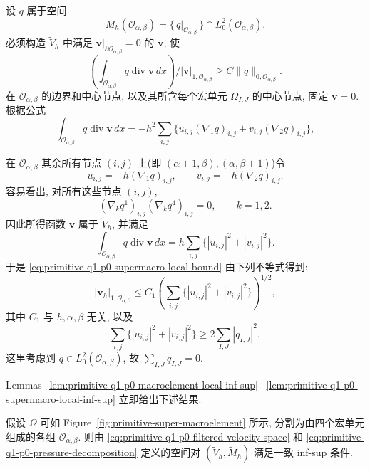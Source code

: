 \begin{Proof}
设 $q$ 属于空间
\[
\bar M_h(\mathcal O_{\alpha,\beta})
=\{\,q|_{\mathcal O_{\alpha,\beta}}\,\}
\cap L_0^2(\mathcal O_{\alpha,\beta}).
\]
必须构造 $\widetilde V_h$ 中满足
$\mathbf v|_{\partial\mathcal O_{\alpha,\beta}}=0$ 的 $\mathbf v$, 使
\begin{equation}\label{eq:primitive-q1-p0-supermacro-local-bound}
\left(\int_{\mathcal O_{\alpha,\beta}}q\operatorname{div}\mathbf v\,dx\right)
/|\mathbf v|_{1,\mathcal O_{\alpha,\beta}}
\geq C\|q\|_{0,\mathcal O_{\alpha,\beta}}.
\end{equation}
在 $\mathcal O_{\alpha,\beta}$ 的边界和中心节点, 以及其所含每个宏单元
$\Omega_{I,J}$ 的中心节点, 固定 $\mathbf v=0$. 根据公式
\[
\int_{\mathcal O_{\alpha,\beta}}q\operatorname{div}\mathbf v\,dx
=-h^2\sum_{i,j}\{u_{i,j}(\nabla_1q)_{i,j}
+v_{i,j}(\nabla_2q)_{i,j}\},
\]

在 $\mathcal O_{\alpha,\beta}$ 其余所有节点 $(i,j)$ 上(即
$(\alpha\pm1,\beta),(\alpha,\beta\pm1)$)令
\[
u_{i,j}=-h(\nabla_1q)_{i,j},
\qquad v_{i,j}=-h(\nabla_2q)_{i,j}.
\]
容易看出, 对所有这些节点 $(i,j)$,
\[
(\nabla_kq^1)_{i,j}(\nabla_kq^4)_{i,j}=0,
\qquad k=1,2.
\]
因此所得函数 $\mathbf v$ 属于 $\widetilde V_h$, 并满足
\[
\int_{\mathcal O_{\alpha,\beta}}q\operatorname{div}\mathbf v\,dx
=h\sum_{i,j}\{|u_{i,j}|^2+|v_{i,j}|^2\}.
\]
于是 \eqref{eq:primitive-q1-p0-supermacro-local-bound} 由下列不等式得到:
\[
|\mathbf v_h|_{1,\mathcal O_{\alpha,\beta}}
\leq C_1\left(\sum_{i,j}\{|u_{i,j}|^2+|v_{i,j}|^2\}\right)^{1/2},
\]
其中 $C_1$ 与 $h,\alpha,\beta$ 无关, 以及
\[
\sum_{i,j}\{|u_{i,j}|^2+|v_{i,j}|^2\}
\geq2\sum_{I,J}|q_{I,J}|^2,
\]
这里考虑到 $q\in L_0^2(\mathcal O_{\alpha,\beta})$, 故
$\sum_{I,J}q_{I,J}=0$.
\end{Proof}

Lemmas~\ref{lem:primitive-q1-p0-macroelement-local-inf-sup}--
\ref{lem:primitive-q1-p0-supermacro-local-inf-sup} 立即给出下述结果.

\setcounter{statement}{3}
\renewcommand{\theHstatement}{theorem.\thesection.\arabic{statement}}
\begin{Theorem}\label{thm:primitive-q1-p0-filtered-inf-sup}
假设 $\Omega$ 可如 Figure~\ref{fig:primitive-super-macroelement}
所示, 分割为由四个宏单元组成的各组 $\mathcal O_{\alpha,\beta}$.
则由 \eqref{eq:primitive-q1-p0-filtered-velocity-space} 和
\eqref{eq:primitive-q1-p0-pressure-decomposition} 定义的空间对
$(\widetilde V_h,\widetilde M_h)$ 满足一致 inf-sup 条件.
\end{Theorem}


